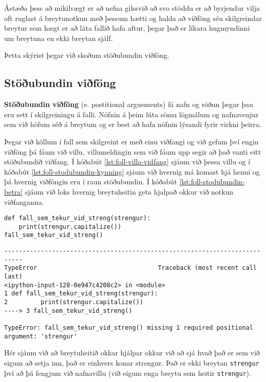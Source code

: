 Ástæða þess að mikilvægt er að nefna gilssvið að svo stöddu er að byrjendur vilja oft ruglast á breytunotkun með þessum hætti og halda að viðföng séu skilgreindar breytur sem hægt er að láta fallið hafa aftur, þegar það er líkara hugmyndinni um breytuna en ekki breytan sjálf.

Þetta skýrist þegar við skoðum stöðubundin viðföng.

\subsection{Stöðubundin viðföng}
\textbf{Stöðubundin viðföng} (e. postitional arguements) fá nafn og röðun þegar þau eru sett í skilgreiningu á falli.
Nöfnin á þeim lúta sömu lögmálum og nafnavenjur sem við höfum séð á breytum og er best að hafa nöfnin lýsandi fyrir virkni þeirra.

Þegar við köllum í fall sem skilgreint er með einu viðfangi og við gefum því engin viðföng þá fáum við villu, villumeldingin sem við fáum upp segir að það vanti eitt stöðubundið viðfang.
Í kóðabút \ref{lst:foll-villa-vidfang} sjáum við þessa villu og í kóðabút \ref{lst:foll-stodubundin-kynning} sjáum við hvernig má komast hjá henni og þá hvernig viðföngin eru í raun stöðubundin.
Í kóðabút \ref{lst:foll-stodubundin-betra} sjáum við loks hvernig breytuheitin geta hjalpað okkur við notkun viðfanganna.

\begin{lstlisting}[caption=Villumelding fyrir ranga notkun á viðföngum, label=lst:foll-villa-vidfang]
def fall_sem_tekur_vid_streng(strengur):
	print(strengur.capitalize())
fall_sem_tekur_vid_streng()
\end{lstlisting}
\lstset{style=uttak}
\begin{lstlisting}
---------------------------------------------------------------------------
TypeError                                 Traceback (most recent call last)
<ipython-input-128-0e947c4208c2> in <module>
1 def fall_sem_tekur_vid_streng(strengur):
2         print(strengur.capitalize())
----> 3 fall_sem_tekur_vid_streng()

TypeError: fall_sem_tekur_vid_streng() missing 1 required positional argument: 'strengur'
\end{lstlisting}
\lstset{style=venjulegt}

Hér sjáum við að breytuheitið okkar hjálpar okkur við að sjá hvað það er sem við eigum að setja inn, það er einhvers konar strengur.
Það er ekki breytan \texttt{strengur} því að þá fengjum við nafnavillu (við eigum enga breytu sem heitir \texttt{strengur}).

